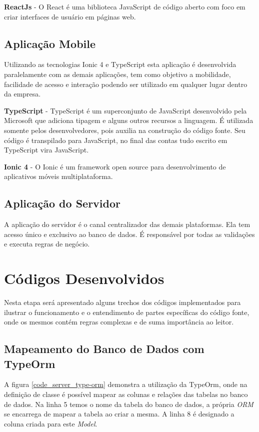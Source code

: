 {\textbf{ReactJs} - O React é uma biblioteca JavaScript de código aberto com foco em criar interfaces de usuário em páginas web.}

\subsection{Aplicação Mobile}
Utilizando as tecnologias Ionic 4 e TypeScript esta aplicação é desenvolvida paralelamente com as demais aplicações, tem como objetivo a mobilidade, facilidade de acesso e interação podendo ser utilizado em qualquer lugar dentro da empresa.

{\textbf{TypeScript} - TypeScript é um superconjunto de JavaScript desenvolvido pela Microsoft que adiciona tipagem e alguns outros recursos a linguagem. É utilizada somente pelos desenvolvedores, pois auxilia na construção do código fonte. Seu código é transpilado para JavaScript, no final das contas tudo escrito em TypeScript vira JavaScript.}

{\textbf{Ionic 4} - O Ionic é um framework open source para desenvolvimento de aplicativos móveis multiplataforma.}

\subsection{Aplicação do Servidor}
A aplicação do servidor é o canal centralizador das demais plataformas. Ela tem acesso único e exclusivo ao banco de dados. É responsável por todas as validações e executa regras de negócio.

\section{Códigos Desenvolvidos} 

Nesta etapa será apresentado alguns trechos dos códigos implementados para ilustrar o funcionamento e o entendimento de partes específicas do código fonte, onde os mesmos contém regras complexas e de suma importância ao leitor.

\subsection{Mapeamento do Banco de Dados com TypeOrm}

A figura \ref{code_server_type-orm} demonstra a utilização da TypeOrm, onde na definição de classe é possível mapear as colunas e relações das tabelas no banco de dados. Na linha 5 temos o nome da tabela do banco de dados, a própria \textit{ORM} se encarrega de mapear a tabela ao criar a mesma. A linha 8 é designado a coluna criada para este \textit{Model}.

